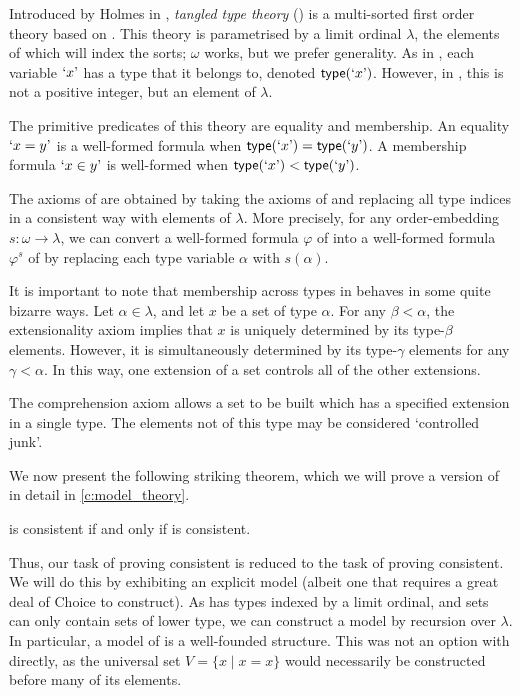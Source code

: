Introduced by Holmes in \cite{holmes-ttt}, \emph{tangled type theory} ({\TTT}) is a multi-sorted first order theory based on {\TST}.
This theory is parametrised by a limit ordinal \( \lambda \), the elements of which will index the sorts; \( \omega \) works, but we prefer generality.
As in {\TST}, each variable \( \mquote{x} \) has a type that it belongs to, denoted \( \ttype(\mquote x) \).
However, in {\TTT}, this is not a positive integer, but an element of \( \lambda \).

The primitive predicates of this theory are equality and membership.
An equality \( \mquote{x = y} \) is a well-formed formula when \( \ttype(\mquote{x}) = \ttype(\mquote{y}) \).
A membership formula \( \mquote{x \in y} \) is well-formed when \( \ttype(\mquote{x}) < \ttype(\mquote{y}) \).

The axioms of {\TTT} are obtained by taking the axioms of {\TST} and replacing all type indices in a consistent way with elements of \( \lambda \).
More precisely, for any order-embedding \( s : \omega \to \lambda \), we can convert a well-formed formula \( \varphi \) of {\TST} into a well-formed formula \( \varphi^s \) of {\TTT} by replacing each type variable \( \alpha \) with \( s(\alpha) \).

It is important to note that membership across types in {\TTT} behaves in some quite bizarre ways.
Let \( \alpha \in \lambda \), and let \( x \) be a set of type \( \alpha \).
For any \( \beta < \alpha \), the extensionality axiom implies that \( x \) is uniquely determined by its type-\( \beta \) elements.
However, it is simultaneously determined by its type-\( \gamma \) elements for any \( \gamma < \alpha \).
In this way, one extension of a set controls all of the other extensions.

The comprehension axiom allows a set to be built which has a specified extension in a single type.
The elements not of this type may be considered `controlled junk'.

We now present the following striking theorem, which we will prove a version of in detail in \cref{c:model_theory}.

\begin{theorem*}[Holmes]
  {\NF} is consistent if and only if {\TTT} is consistent. \cite{holmes-ttt}
\end{theorem*}

Thus, our task of proving {\NF} consistent is reduced to the task of proving {\TTT} consistent.
We will do this by exhibiting an explicit model (albeit one that requires a great deal of Choice to construct).
As {\TTT} has types indexed by a limit ordinal, and sets can only contain sets of lower type, we can construct a model by recursion over \( \lambda \).
In particular, a model of {\TTT} is a well-founded structure.
This was not an option with {\NF} directly, as the universal set \( V = \{ x \mid x = x \} \) would necessarily be constructed before many of its elements.

